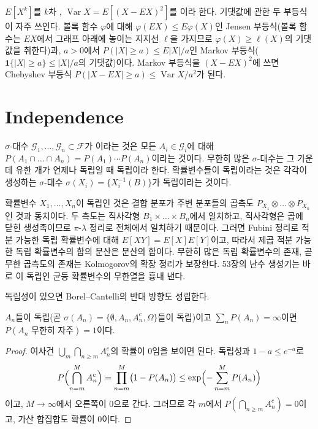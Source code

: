 $E[X^k]$를 $k$차 , $\operatorname{Var}X=E[(X-EX)^2]$를 이라 한다. 기댓값에 관한 두 부등식이 자주 쓰인다. 볼록 함수 $\varphi$에 대해 $\varphi(E X)\le E\varphi(X)$인 Jensen 부등식(볼록 함수는 $EX$에서 그래프 아래에 놓이는 지지선 $\ell$을 가지므로 $\varphi(X)\ge\ell(X)$의 기댓값을 취한다)과, $a>0$에서 $P(|X|\ge a)\le E|X|/a$인 Markov 부등식($\mathbf 1\{|X|\ge a\}\le|X|/a$의 기댓값)이다. Markov 부등식을 $(X-EX)^2$에 쓰면 Chebyshev 부등식 $P(|X-EX|\ge a)\le\operatorname{Var}X/a^2$가 된다.

\section{Independence}
\label{sec:independence}

$\sigma$-대수 $\mathcal G_1,\dots,\mathcal G_n\subset\mathcal F$가 이라는 것은 모든 $A_i\in\mathcal G_i$에 대해 $P(A_1\cap\dots\cap A_n)=P(A_1)\cdots P(A_n)$이라는 것이다. 무한히 많은 $\sigma$-대수는 그 가운데 유한 개가 언제나 독립일 때 독립이라 한다. 확률변수들이 독립이라는 것은 각각이 생성하는 $\sigma$-대수 $\sigma(X_i)=\{X_i^{-1}(B)\}$가 독립이라는 것이다.

확률변수 $X_1,\dots,X_n$이 독립인 것은 결합 분포가 주변 분포들의 곱측도 $P_{X_1}\otimes\dots\otimes P_{X_n}$인 것과 동치이다. 두 측도는 직사각형 $B_1\times\dots\times B_n$에서 일치하고, 직사각형은 곱에 닫힌 생성족이므로 $\pi$-$\lambda$ 정리로 전체에서 일치하기 때문이다. 그러면 Fubini 정리로 적분 가능한 독립 확률변수에 대해 $E[XY]=E[X]E[Y]$이고, 따라서 제곱 적분 가능한 독립 확률변수의 합의 분산은 분산의 합이다. 무한히 많은 독립 확률변수의 존재, 곧 무한 곱측도의 존재는 Kolmogorov의 확장 정리가 보장한다\cite{billingsley1995}. 53장의 난수 생성기는 바로 이 독립인 균등 확률변수의 무한열을 흉내 낸다.

독립성이 있으면 Borel--Cantelli의 반대 방향도 성립한다.

\begin{lemma}
\label{lem:borel-cantelli-2}
$A_n$들이 독립(곧 $\sigma(A_n)=\{\emptyset,A_n,A_n^c,\Omega\}$들이 독립)이고 $\sum_nP(A_n)=\infty$이면 $P(A_n\text{ 무한히 자주})=1$이다.
\end{lemma}

\begin{proof}
여사건 $\bigcup_m\bigcap_{n\ge m}A_n^c$의 확률이 $0$임을 보이면 된다. 독립성과 $1-a\le e^{-a}$로
\[
P\Bigl(\bigcap_{n=m}^MA_n^c\Bigr)=\prod_{n=m}^M\bigl(1-P(A_n)\bigr)\le\exp\Bigl(-\sum_{n=m}^MP(A_n)\Bigr)
\]
이고, $M\to\infty$에서 오른쪽이 $0$으로 간다. 그러므로 각 $m$에서 $P(\bigcap_{n\ge m}A_n^c)=0$이고, 가산 합집합도 확률이 $0$이다.
\end{proof}

